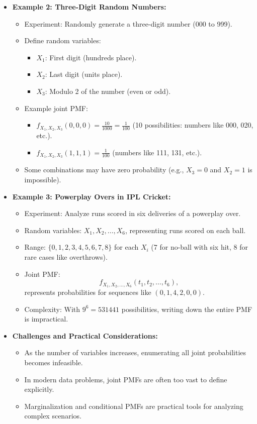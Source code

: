 \documentclass{article}
\begin{document}
\begin{itemize}
  \item \textbf{Example 2: Three-Digit Random Numbers:}
    \begin{itemize}
      \item Experiment: Randomly generate a three-digit number (000 to 999).
      \item Define random variables:
        \begin{itemize}
          \item $X_1$: First digit (hundreds place).
          \item $X_2$: Last digit (units place).
          \item $X_3$: Modulo 2 of the number (even or odd).
        \end{itemize}
      \item Example joint PMF:
        \begin{itemize}
          \item $f_{X_1, X_2, X_3}(0, 0, 0) = \frac{10}{1000} = \frac{1}{100}$ (10 possibilities: numbers like 000, 020, etc.).
          \item $f_{X_1, X_2, X_3}(1, 1, 1) = \frac{1}{100}$ (numbers like 111, 131, etc.).
        \end{itemize}
      \item Some combinations may have zero probability (e.g., $X_3 = 0$ and $X_2 = 1$ is impossible).
    \end{itemize}

  \item \textbf{Example 3: Powerplay Overs in IPL Cricket:}
    \begin{itemize}
      \item Experiment: Analyze runs scored in six deliveries of a powerplay over.
      \item Random variables: $X_1, X_2, \dots, X_6$, representing runs scored on each ball.
      \item Range: $\{0, 1, 2, 3, 4, 5, 6, 7, 8\}$ for each $X_i$ (7 for no-ball with six hit, 8 for rare cases like overthrows).
      \item Joint PMF:
        \[
          f_{X_1, X_2, \dots, X_6}(t_1, t_2, \dots, t_6),
        \]
        represents probabilities for sequences like $(0, 1, 4, 2, 0, 0)$.
      \item Complexity: With $9^6 = 531441$ possibilities, writing down the entire PMF is impractical.
    \end{itemize}

  \item \textbf{Challenges and Practical Considerations:}
    \begin{itemize}
      \item As the number of variables increases, enumerating all joint probabilities becomes infeasible.
      \item In modern data problems, joint PMFs are often too vast to define explicitly.
      \item Marginalization and conditional PMFs are practical tools for analyzing complex scenarios.
    \end{itemize}
\end{itemize}
\end{document}
